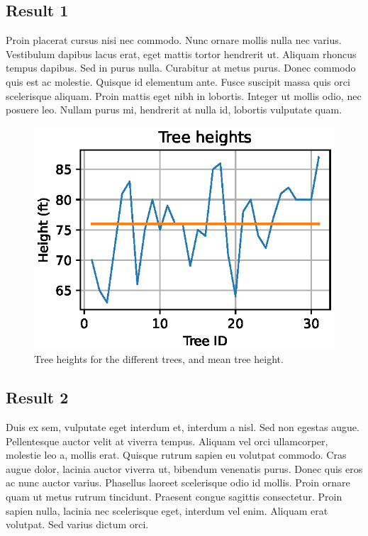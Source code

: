 \hypertarget{result-1}{%
\subsection{Result 1}\label{result-1}}

Proin placerat cursus nisi nec commodo. Nunc ornare mollis nulla nec
varius. Vestibulum dapibus lacus erat, eget mattis tortor hendrerit ut.
Aliquam rhoncus tempus dapibus. Sed in purus nulla. Curabitur at metus
purus. Donec commodo quis est ac molestie. Quisque id elementum ante.
Fusce suscipit massa quis orci scelerisque aliquam. Proin mattis eget
nibh in lobortis. Integer ut mollis odio, nec posuere leo. Nullam purus
mi, hendrerit at nulla id, lobortis vulputate quam.

\begin{figure}
\centering
\includegraphics{figures/tree-heights.eps}
\caption{Tree heights for the different trees, and mean tree height.}
\end{figure}

\hypertarget{result-2}{%
\subsection{Result 2}\label{result-2}}

Duis ex sem, vulputate eget interdum et, interdum a nisl. Sed non
egestas augue. Pellentesque auctor velit at viverra tempus. Aliquam vel
orci ullamcorper, molestie leo a, mollis erat. Quisque rutrum sapien eu
volutpat commodo. Cras augue dolor, lacinia auctor viverra ut, bibendum
venenatis purus. Donec quis eros ac nunc auctor varius. Phasellus
laoreet scelerisque odio id mollis. Proin ornare quam ut metus rutrum
tincidunt. Praesent congue sagittis consectetur. Proin sapien nulla,
lacinia nec scelerisque eget, interdum vel enim. Aliquam erat volutpat.
Sed varius dictum orci.

